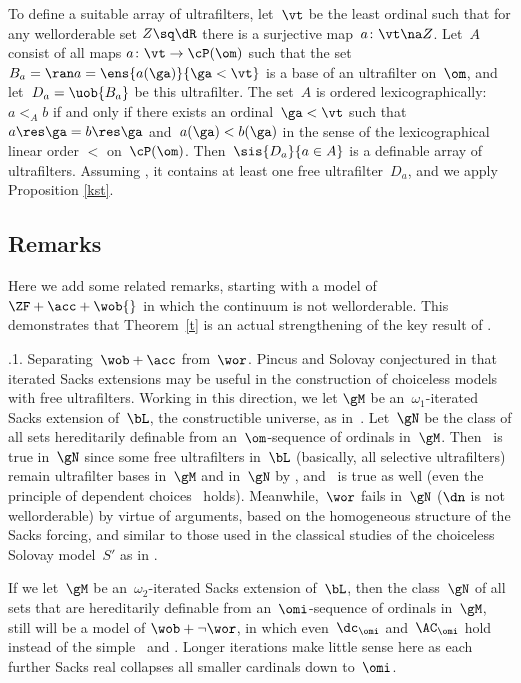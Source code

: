 \documentclass[11pt,
]{article}
\begin{document}
To define a suitable array of ultrafilters, 
let~$\vt$ be the least ordinal such that for 
any wellorderable set
$Z\sq\dR$ there is a surjective map~$a\colon\vt\na Z$.
Let~$A$ consist of all maps 
$a\colon\vt\to\cP(\om)$  such that the set
$B_a=\ran a=\ens{a(\ga)}{\ga<\vt}$ is a base of an
ultrafilter on~$\om$, and let~$D_a=\uob{B_a}$ be this ultrafilter.
The set~$A$ is ordered lexicographically:~$a<_A b$ if and only if
there exists an ordinal~$\ga<\vt$ such that~${a\res\ga}={b\res\ga}$
and~$a(\ga)<b(\ga)$ in the sense of the lexicographical linear order
$<$ on~$\cP(\om)$.  Then~$\sis{D_a}{a\in A}$ is a definable array of
ultrafilters.  Assuming \wob, it contains at least one free
ultrafilter\/~$D_{a}$, and we apply Proposition \ref{kst}.  \epf






\subsection{Remarks}
\label{s2}

Here we add some related remarks, starting with a model
of~$\ZF+\acc+\wob{}$ in which the continuum is not wellorderable.
This demonstrates that Theorem~\ref{t} is an actual strengthening of
the key result of \cite{KS}.\vom


{\ubf{}.1.  Separating~$\wob+\acc$ from~$\wor$.}
\label{s41}
Pincus and Solovay conjectured in \cite[p.]{ps} that iterated
Sacks extensions may be useful in the construction of choiceless
models with free ultrafilters.  Working in this direction, we let
$\gM$ be an~$\omega_1$-iterated Sacks extension of~$\bL$, the
constructible universe, as in~\cite{bl}.
%  
Let~$\gN$ be the class of all sets hereditarily   
definable from an~$\om$-sequence of ordinals in~$\gM$.  
Then \wob\ is true in~$\gN$ since some free ultrafilters 
in~$\bL$ 
(basically, all selective ultrafilters) 
remain ultrafilter bases in~$\gM$ and in~$\gN$ by
\cite[Section]{bl}, and \acc\ is true as well 
(even the principle of dependent choices \dc\ holds). 
Meanwhile,~$\wor$ fails in~$\gN$ 
($\dn$ is not wellorderable) 
by virtue of arguments, based on the homogeneous 
structure of the Sacks forcing, and similar to those 
used in the classical studies of the 
choiceless Solovay model~$S'$ as in 
\cite[Part III, proof of Theorem]{sol}.

If we let~$\gM$ be an~$\omega_2$-iterated Sacks extension of~$\bL$,
then the class~$\gN$ of all sets that are hereditarily definable from
an~$\omi$-sequence of ordinals in~$\gM$, still will be a model of
$\wob+\neg\wor$, in which even~$\dc_{\omi}$ and~$\AC_{\omi}$ hold
instead of the simple \dc\ and \acc.  Longer iterations make little
sense here as each further Sacks real collapses all smaller cardinals
down to~$\omi$.
\end{document}
